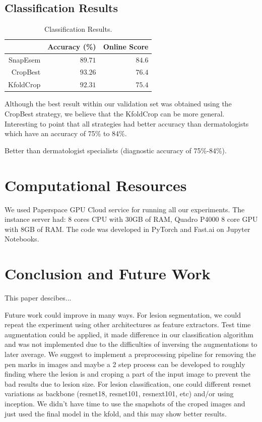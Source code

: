 \documentclass[conference]{IEEEtran}
\begin{document}
\subsection{Classification Results}

\begin{table}[]
\centering
\caption{Classification Results.}
\label{tabela}
\begin{tabular}{@{}rrr@{}}
\toprule
            & \multicolumn{1}{c}{Accuracy (\%)} & \multicolumn{1}{c}{Online Score} \\ \midrule
SnapEsem & \(89.71\)& \(84.6\)                                  \\ \midrule
CropBest   & \(93.26\)&  \(76.4\)                                \\ \midrule
KfoldCrop    & \(92.31\)  & \(75.4\)                              \\ \bottomrule
\end{tabular}
\end{table}

Although the best result within our validation set was obtained using the CropBest strategy, we believe that the KfoldCrop can be more general. Interesting to point that all strategies had better accuracy than dermatologists which have an accuracy of 75\% to 84\%\cite{isic}. 

Better than dermatologist specialists (diagnostic accuracy of 75\%-84\%).

\section{Computational Resources\label{resources}}
We used Paperspace GPU Cloud service for running all our experiments. The instance server had: 8 cores CPU with 30GB of RAM, Quadro P4000 8 core GPU with 8GB of RAM. 
The code was developed in PyTorch and Fast.ai\cite{fastai} on Jupyter Notebooks.
\section{Conclusion and Future Work}

This paper descibes... 

Future work could improve in many ways. For lesion segmentation, we could repeat the experiment using other architectures as feature extractors. Test time augmentation could be applied, it made difference in our classification algorithm and was not implemented due to the difficulties of inversing the augmentations to later average.  We suggest to implement a preprocessing pipeline for removing the pen marks in images and maybe a 2 step process can be developed to roughly finding where the lesion is and croping a part of the input image to prevent the bad results due to lesion size. For lesion classification, one could different resnet variations as backbone (resnet18, resnet101, resnext101, etc) and/or using inception. We didn't have time to use the snapshots of the croped images and just used the final model in the kfold, and this may show better results.





\end{document}
